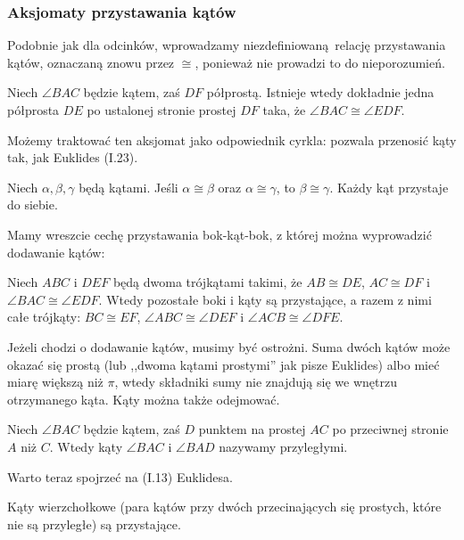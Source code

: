 \subsubsection{Aksjomaty przystawania kątów}
Podobnie jak dla odcinków, wprowadzamy niezdefiniowaną relację przystawania kątów, oznaczaną znowu przez $\cong$, ponieważ nie prowadzi to do nieporozumień.

\begin{axiom}[przystawania, C4]
    Niech $\angle BAC$ będzie kątem, zaś $DF$ półprostą.
    Istnieje wtedy dokładnie jedna półprosta $DE$ po ustalonej stronie prostej $DF$ taka, że $\angle BAC \cong \angle EDF$.
\end{axiom}

Możemy traktować ten aksjomat jako odpowiednik cyrkla: pozwala przenosić kąty tak, jak Euklides (I.23).

\begin{axiom}[przystawania, C5]
    Niech $\alpha, \beta, \gamma$ będą kątami.
    Jeśli $\alpha \cong \beta$ oraz $\alpha \cong \gamma$, to $\beta \cong \gamma$.
    Każdy kąt przystaje do siebie.
\end{axiom}

Mamy wreszcie cechę przystawania bok-kąt-bok, z której można wyprowadzić dodawanie kątów:

\begin{axiom}[przystawania, C6]
    Niech $ABC$ i $DEF$ będą dwoma trójkątami takimi, że $AB \cong DE$, $AC \cong DF$ i $\angle BAC \cong \angle EDF$.
    Wtedy pozostałe boki i kąty są przystające, a razem z nimi całe trójkąty: $BC \cong EF$, $\angle ABC \cong \angle DEF$ i $\angle ACB \cong \angle DFE$.
\end{axiom}

Jeżeli chodzi o dodawanie kątów, musimy być ostrożni.
Suma dwóch kątów może okazać się prostą (lub ,,dwoma kątami prostymi'' jak pisze Euklides) albo mieć miarę większą niż $\pi$, wtedy składniki sumy nie znajdują się we wnętrzu otrzymanego kąta.
Kąty można także odejmować.

\begin{definition}
    Niech $\angle BAC$ będzie kątem, zaś $D$ punktem na prostej $AC$ po przeciwnej stronie $A$ niż $C$.
    Wtedy kąty $\angle BAC$ i $\angle BAD$ nazywamy przyległymi. %
\end{definition}

Warto teraz spojrzeć na (I.13) Euklidesa.

\begin{proposition}
    Kąty wierzchołkowe (para kątów przy dwóch przecinających się prostych, które nie są przyległe) są przystające.
\end{proposition}

